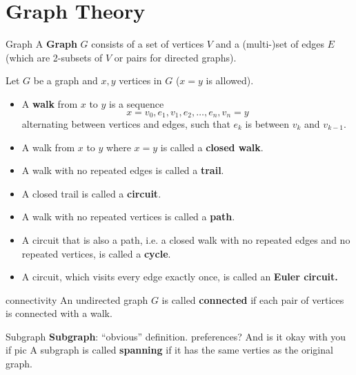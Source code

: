 \documentclass[english]{lbscript}
\begin{document}
\section{Graph Theory}
\label{sec:graph-theory}

\begin{definition}{Graph}{}
  A \textbf{Graph} \(G\) consists of a set of vertices \(V\) and a (multi-)set of edges \(E\) (which are 2-subsets of \(V\) or pairs for directed graphs).
\end{definition}

\begin{definition}{}{}
  Let \(G\) be a graph and \(x, y\) vertices in \(G\) (\(x=y\) is allowed).
  \begin{itemize}
    \item A \textbf{walk} from \(x\) to \(y\) is a sequence
          \begin{equation}
            \label{eq:94}
            x= v_0,e_1,v_1,e_2,\dots, e_n, v_n=y
          \end{equation}
          alternating between vertices and edges, such that \(e_k\) is between \(v_k\) and \(v_{k-1}\).
    \item A walk from \(x\) to \(y\) where \(x=y\) is called a \textbf{closed walk}.
    \item A walk with no repeated edges is called a \textbf{trail}.
    \item A closed trail is called a \textbf{circuit}.
    \item A walk with no repeated vertices is called a \textbf{path}.
    \item A circuit that is also a path, i.e. a closed walk with no repeated edges and no repeated vertices, is called a \textbf{cycle}.
    \item A circuit, which visits every edge exactly once, is called an \textbf{Euler circuit.} %
  \end{itemize}
\end{definition}

\begin{definition}{connectivity}{}
  An undirected graph \(G\) is called \textbf{connected} if each pair of vertices is connected with a walk.
\end{definition}

\begin{definition}{Subgraph}{}
  \textbf{Subgraph}: \enquote{obvious} definition.
  preferences? And is it okay with you if pic
  A subgraph is called \textbf{spanning} if it has the same verties as the original graph.
\end{definition}
\end{document}
